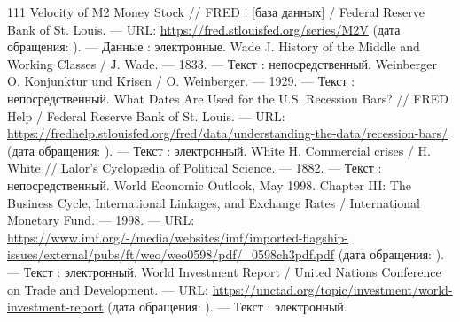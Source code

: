 \begin{RaggedRight}
\begin{thebibliography}{111}
     \hypertarget{bib:FRED-M2V}{} Velocity of M2 Money Stock // FRED : [база данных] / Federal Reserve Bank of St. Louis. --- URL: \url{https://fred.stlouisfed.org/series/M2V} (дата обращения: \bibaccessdate). --- Данные : электронные.
     \hypertarget{bib:Wade-1833}{} Wade J. History of the Middle and Working Classes / J. Wade. --- 1833. --- Текст : непосредственный.
     \hypertarget{bib:Weinberger-1929}{} Weinberger O. Konjunktur und Krisen / O. Weinberger. --- 1929. --- Текст : непосредственный.
     \hypertarget{bib:NBER}{} What Dates Are Used for the U.S. Recession Bars? // FRED Help / Federal Reserve Bank of St. Louis. --- URL: \url{https://fredhelp.stlouisfed.org/fred/data/understanding-the-data/recession-bars/} (дата обращения: \bibaccessdate). --- Текст : электронный.
     \hypertarget{bib:White-1882}{} White H. Commercial crises / H. White // Lalor’s Cyclopædia of Political Science. --- 1882. --- Текст : непосредственный.
     \hypertarget{bib:IMF-1998}{} World Economic Outlook, May 1998. Chapter III: \textquotedbl{}The Business Cycle, International Linkages, and Exchange Rates\textquotedbl{} / International Monetary Fund. --- 1998. --- URL: \url{https://www.imf.org/-/media/websites/imf/imported-flagship-issues/external/pubs/ft/weo/weo0598/pdf/_0598ch3pdf.pdf} (дата обращения: \bibaccessdate). --- Текст : электронный.
     \hypertarget{bib:UNCTAD}{} World Investment Report / United Nations Conference on Trade and Development. --- URL: \url{https://unctad.org/topic/investment/world-investment-report} (дата обращения: \bibaccessdate). --- Текст : электронный.
\end{thebibliography}
\end{RaggedRight}
